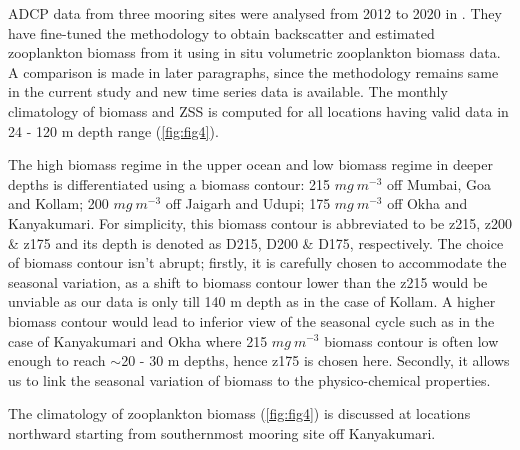 \documentclass{article}
\begin{document}
	ADCP data from three mooring sites were analysed from 2012 to 2020 in \citep{aparna2022seasonal}. They have fine-tuned the methodology to obtain backscatter and estimated zooplankton biomass from it using in situ volumetric zooplankton biomass data. A comparison is made in later paragraphs, since the methodology remains same in the current study and new time series data is available. The monthly climatology of biomass and ZSS is computed for all locations having valid data in 24 - 120 m depth range (\cref{fig:fig4}).
	 
	

	The high biomass regime in the upper ocean and low biomass regime in deeper depths is differentiated using a biomass contour: 215 $mg \ m^{-3}$ off Mumbai, Goa and Kollam; 200 $mg \ m^{-3}$ off Jaigarh and Udupi; 175 $mg \ m^{-3}$ off Okha and Kanyakumari. For simplicity, this biomass contour is abbreviated to be z215, z200 \& z175 and its depth is denoted as D215, D200 \& D175, respectively. The choice of biomass contour isn't abrupt; firstly, it is carefully chosen to accommodate the seasonal variation, as a shift to biomass contour lower than the z215 would be unviable as our data is only till 140 m depth as in the case of Kollam. A higher biomass contour would lead to inferior view of the seasonal cycle such as in the case of Kanyakumari and Okha where 215 $mg \ m^{-3}$ biomass contour is often low enough to reach $\sim$20 - 30 m depths, hence z175 is chosen here. Secondly, it allows us to link the seasonal variation of biomass to the physico-chemical properties.
	
	The climatology of zooplankton biomass (\cref{fig:fig4}) is discussed at locations northward starting from southernmost mooring site off Kanyakumari. 
	
\end{document}
